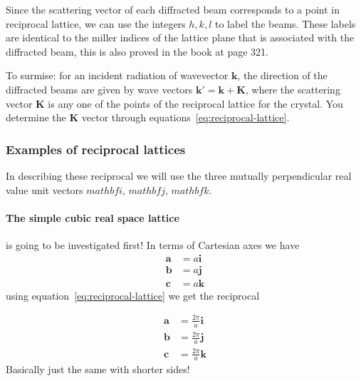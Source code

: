 \documentclass[11pt]{article}
\begin{document}
Since the scattering vector of each diffracted beam corresponds to a point in reciprocal lattice, we can use the integers $h,k,l$ to label the beams. These labels are identical to the miller indices of the lattice plane that is associated with the diffracted beam, this is also proved in the book at page 321.   

To surmise: for an incident radiation of wavevector $\mathbf{k}$, the direction of the diffracted beams are given by wave vectors $\mathbf{k'} = \mathbf{k} + \mathbf{K}$, where the scattering vector $\mathbf{K}$ is any one of the points of the reciprocal lattice for the crystal. You determine the $\mathbf{K}$ vector through equations~\ref{eq:reciprocal-lattice}.

\subsubsection{Examples of reciprocal lattices}
In describing these reciprocal we will use the three mutually perpendicular real value unit vectors $mathbf{i}$, $mathbf{j}$, $mathbf{k}$.
\paragraph{The simple cubic real space lattice} is going to be investigated first!
In terms of Cartesian axes we have 
\begin{align}
	\mathbf{a} &= a\mathbf{i} \nonumber\\
	\mathbf{b} &= a\mathbf{j} \nonumber\\
	\mathbf{c} &= a\mathbf{k} 
\end{align}
using equation~\ref{eq:reciprocal-lattice} we get the reciprocal

\begin{align}
	\mathbf{a} &= \frac{2\pi}{a}\mathbf{i} \nonumber\\
	\mathbf{b} &= \frac{2\pi}{a}\mathbf{j} \nonumber\\
	\mathbf{c} &= \frac{2\pi}{a}\mathbf{k}  
\end{align}
Basically just the same with shorter sides!

\newpage
\end{document}
